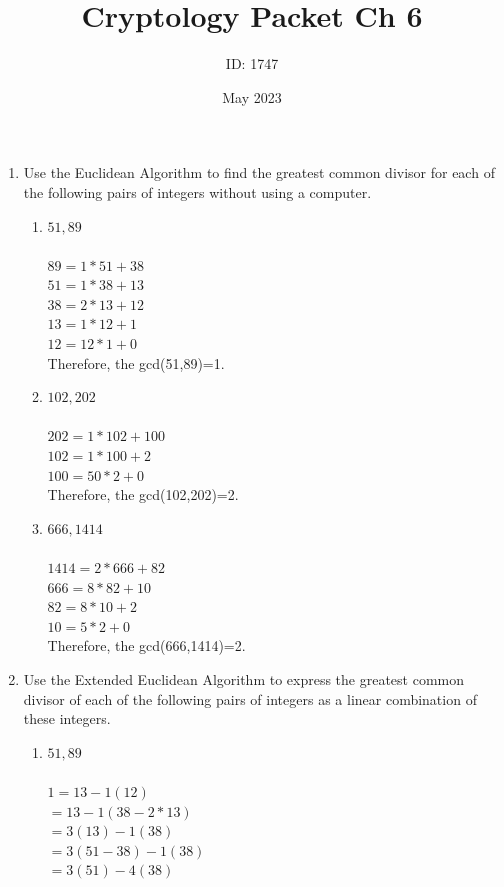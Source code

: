 \documentclass[]{article}
\date{May 2023}
\author{ID: 1747}
\title{Cryptology Packet Ch 6}
\begin{document}
\maketitle

\begin{enumerate}
    \item Use the Euclidean Algorithm to find the greatest common divisor for each of the following pairs of integers without using a computer.
    \begin{enumerate}
        \item $51,89$
        \\\\ $89 = 1*51+38$
        \\$51=1*38+13$
        \\$38=2*13+12$
        \\$13=1*12+1$
        \\$12=12*1+0$
        \\Therefore, the gcd(51,89)=1. 
        \item $102,202$
        \\\\ $202=1*102+100$
        \\$102=1*100+2$
        \\$100=50*2+0$
        \\Therefore, the gcd(102,202)=2.
        \item $666,1414$
        \\\\ $1414=2*666+82$
        \\$666=8*82+10$
        \\$82=8*10+2$
        \\$10=5*2+0$
        \\Therefore, the gcd(666,1414)=2.
    \end{enumerate}
    \item Use the Extended Euclidean Algorithm to express the greatest common divisor of each of the following pairs of integers as a linear combination of these integers.
    \begin{enumerate}
        \item $51,89$
        \\\\ $1=13-1(12)$
        \\$=13-1(38-2*13)$
        \\$=3(13)-1(38)$
        \\$=3(51-38)-1(38)$
        \\$=3(51)-4(38)$

\end{enumerate}
\end{enumerate}
\end{document}
